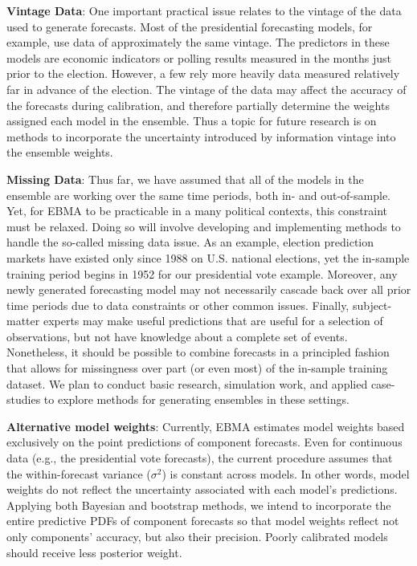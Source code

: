 \documentclass[pdftex,12pt,fullpage,oneside]{amsart}
\begin{document}

\textbf{Vintage Data}: One important practical issue relates to the
vintage of the data used to generate forecasts.  Most of the
presidential forecasting models, for example, use data of
approximately the same vintage.  The predictors in these models are
economic indicators or polling results measured in the months just
prior to the election.  However, a few rely more heavily data measured
relatively far in advance of the election. The vintage of the data may
affect the accuracy of the forecasts during calibration, and therefore
partially determine the weights assigned each model in the ensemble.
Thus a topic for future research is on methods to incorporate the
uncertainty introduced by information vintage into the ensemble
weights.

\textbf{Missing Data}: Thus far, we have assumed that all of the
models in the ensemble are working over the same time periods, both
in- and out-of-sample. Yet, for EBMA to be practicable in a many
political contexts, this constraint must be relaxed.  Doing so will
involve developing and implementing methods to handle the so-called
missing data issue. As an example, election prediction markets have
existed only since 1988 on U.S. national elections, yet the in-sample
training period begins in 1952 for our presidential vote example.
Moreover, any newly generated forecasting model may not necessarily
cascade back over all prior time periods due to data constraints or
other common issues. Finally, subject-matter experts may make useful
predictions that are useful for a selection of observations, but not
have knowledge about a complete set of events.  Nonetheless, it should
be possible to combine forecasts in a principled fashion that allows
for missingness over part (or even most) of the in-sample training
dataset.  We plan to conduct basic research, simulation work, and
applied case-studies to explore methods for generating ensembles in
these settings.

\textbf{Alternative model weights}: Currently, EBMA estimates model
weights based exclusively on the point predictions of component
forecasts.  Even for continuous data (e.g., the presidential vote
forecasts), the current procedure assumes that the within-forecast
variance ($\sigma^2$) is constant across models.  In other words,
model weights do not reflect the uncertainty associated with each
model's predictions.  Applying both Bayesian and bootstrap methods, we
intend to incorporate the entire predictive PDFs of component
forecasts so that model weights reflect not only components' accuracy,
but also their precision.  Poorly calibrated models should receive less
posterior weight.
\end{document}
